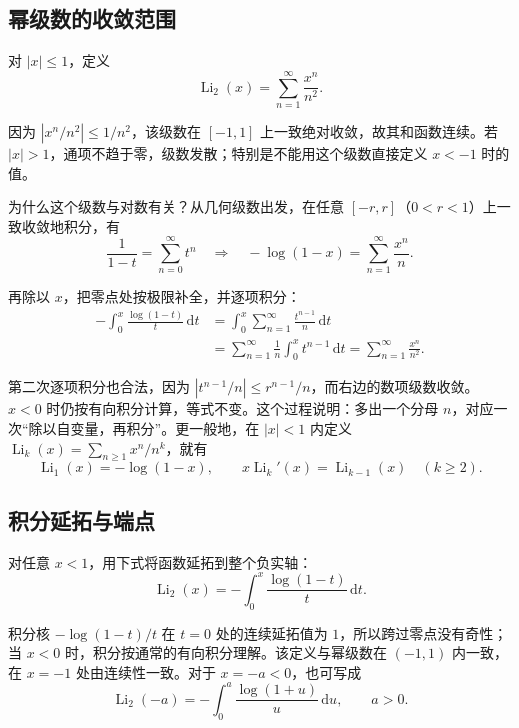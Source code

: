 \documentclass[11pt,a4paper]{article}
\begin{document}
\hypertarget{ux5e42ux7ea7ux6570ux7684ux6536ux655bux8303ux56f4}{%
\subsection{幂级数的收敛范围}\label{ux5e42ux7ea7ux6570ux7684ux6536ux655bux8303ux56f4}}

对 \(|x|\leqslant1\)，定义
\[
\operatorname{Li}_2(x)=\sum_{n=1}^{\infty}\frac{x^n}{n^2}.
\]

因为 \(|x^n/n^2|\leqslant1/n^2\)，该级数在 \([-1,1]\)
上一致绝对收敛，故其和函数连续。若
\(|x|>1\)，通项不趋于零，级数发散；特别是不能用这个级数直接定义 \(x<-1\)
时的值。

为什么这个级数与对数有关？从几何级数出发，在任意
\([-r,r]\)（\(0<r<1\)）上一致收敛地积分，有
\[
\frac1{1-t}=\sum_{n=0}^{\infty}t^n
\quad\Longrightarrow\quad
-\log(1-x)=\sum_{n=1}^{\infty}\frac{x^n}{n}.
\]

再除以 \(x\)，把零点处按极限补全，并逐项积分：
\[
\begin{aligned}
-\int_0^x\frac{\log(1-t)}t\,\mathrm dt
&=\int_0^x\sum_{n=1}^{\infty}\frac{t^{n-1}}n\,\mathrm dt\\
&=\sum_{n=1}^{\infty}\frac1n\int_0^xt^{n-1}\,\mathrm dt
=\sum_{n=1}^{\infty}\frac{x^n}{n^2}.
\end{aligned}
\]

第二次逐项积分也合法，因为
\(|t^{n-1}/n|\leqslant r^{n-1}/n\)，而右边的数项级数收敛。\(x<0\)
时仍按有向积分计算，等式不变。这个过程说明：多出一个分母
\(n\)，对应一次``除以自变量，再积分''。更一般地，在 \(|x|<1\) 内定义
\(\operatorname{Li}_k(x)=\sum_{n\geqslant1}x^n/n^k\)，就有
\[
\operatorname{Li}_1(x)=-\log(1-x),\qquad
x\operatorname{Li}_k'(x)=\operatorname{Li}_{k-1}(x)\quad(k\geqslant2).
\]

\hypertarget{ux79efux5206ux5ef6ux62d3ux4e0eux7aefux70b9}{%
\subsection{积分延拓与端点}\label{ux79efux5206ux5ef6ux62d3ux4e0eux7aefux70b9}}

对任意 \(x<1\)，用下式将函数延拓到整个负实轴：
\[
\operatorname{Li}_2(x)=-\int_0^x\frac{\log(1-t)}t\,\mathrm dt.
\]

积分核 \(-\log(1-t)/t\) 在 \(t=0\) 处的连续延拓值为
\(1\)，所以跨过零点没有奇性；当 \(x<0\)
时，积分按通常的有向积分理解。该定义与幂级数在 \((-1,1)\) 内一致，在
\(x=-1\) 处由连续性一致。对于 \(x=-a<0\)，也可写成
\[
\operatorname{Li}_2(-a)=-\int_0^a\frac{\log(1+u)}u\,\mathrm du,
\qquad a>0.
\]
\end{document}
